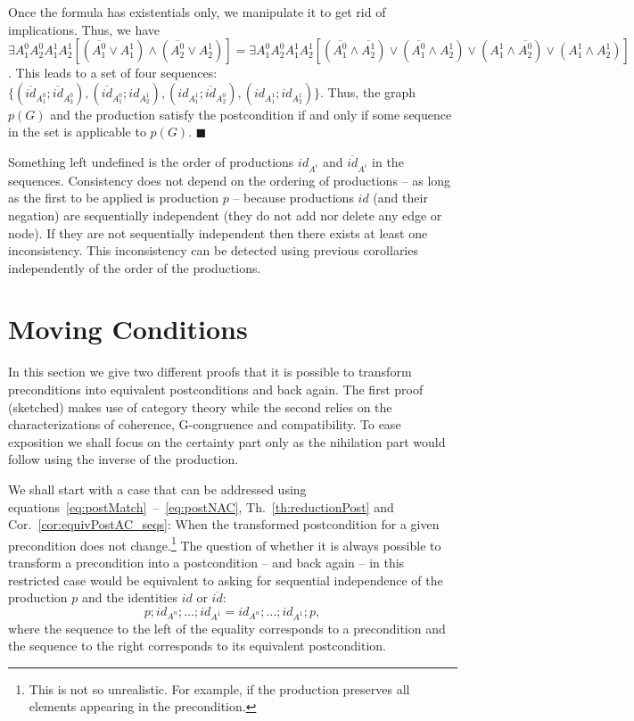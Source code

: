 \documentclass{fundam}
\newcommand{\proofend}{\hfill$\blacksquare$}
\begin{document}
Once the formula has existentials only, we manipulate it to get rid of
implications. Thus, we have $\exists A^0_1 A^0_2 A^1_1 A^1_2
[(\overline{A^0_1} \vee A^1_1) \wedge (\overline{A^0_2} \vee A^1_2)] =
\exists A^0_1 A^0_2 A^1_1 A^1_2 [(\overline{A^0_1} \wedge
\overline{A^1_2}) \vee (\overline{A^0_1} \wedge A^1_2) \vee (A^1_1
\wedge \overline{A^0_2}) \vee (A^1_1 \wedge A^1_2)]$. This leads to a
set of four sequences:
$\{(\overline{id}_{A^0_1}; \overline{id}_{A^0_2}),
(\overline{id}_{A^0_1}; id_{A^1_2}), (id_{A^1_1};
\overline{id}_{A^0_2}), (id_{A^1_1}; id_{A^1_2})\}$. Thus, the graph
$p(G)$ and the production satisfy the postcondition if and only if some
sequence in the set is applicable to $p(G)$. \proofend

Something left undefined is the order of productions $id_{A^i}$ and
$\overline{id}_{A^i}$ in the sequences. Consistency does not depend on
the ordering of productions -- as long as the first to be applied is
production $p$ -- because productions $id$ (and their negation) are
sequentially independent (they do not add nor delete any edge or
node). If they are not sequentially independent then there exists at
least one inconsistency. This inconsistency can be detected using
previous corollaries independently of the order of the productions.

\section{Moving Conditions}
\label{sec:movingConditions}


In this section we give two different proofs that it is possible to
transform preconditions into equivalent postconditions and back
again. The first proof (sketched) makes use of category theory while
the second relies on the characterizations of coherence, G-congruence
and compatibility. To ease exposition we shall focus on the certainty
part only as the nihilation part would follow using the inverse of the
production.



We shall start with a case that can be addressed using
equations~\eqref{eq:postMatch}~--~\eqref{eq:postNAC},
Th.~\ref{th:reductionPost} and Cor.~\ref{cor:equivPostAC_seqs}: When
the transformed postcondition for a given precondition does not
change.\footnote{This is not so unrealistic. For example, if the
  production preserves all elements appearing in the precondition.}
The question of whether it is always possible to transform a
precondition into a postcondition -- and back again -- in this
restricted case would be equivalent to asking for sequential
independence of the production $p$ and the identities $id$ or
$\overline{id}$:
\begin{equation}
  \label{eq:4}
  p;id_{A^n}; \ldots; id_{A^1} = id_{A^n}; \ldots; id_{A^1};p,
\end{equation}
where the sequence to the left of the equality corresponds to a
precondition and the sequence to the right corresponds to its
equivalent postcondition.
\end{document}
